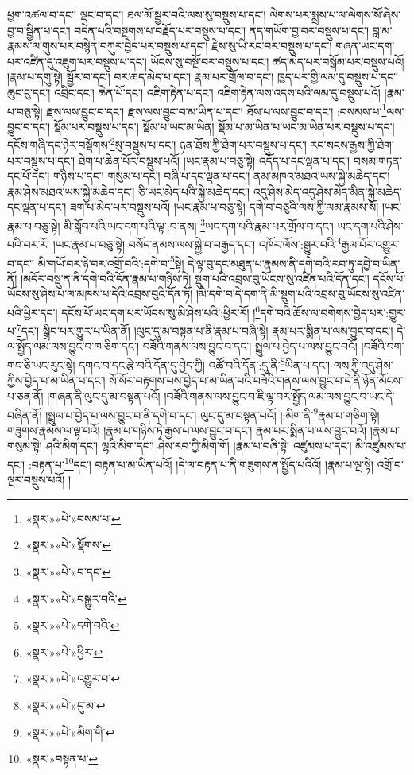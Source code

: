 ཕྱག་འཚལ་བ་དང་། ལྡང་བ་དང་། ཐལ་མོ་སྦྱར་བའི་ལས་སུ་བསྡུས་པ་དང་། ལེགས་པར་སྨྲས་པ་ལ་ལེགས་སོ་ཞེས་བྱ་བ་སྦྱིན་པ་དང་། བདེན་པའི་བསྔགས་པ་བརྗོད་པར་བསྡུས་པ་དང་། ནད་གཡོག་བྱ་བར་བསྡུས་པ་དང་། བླ་མ་རྣམས་ལ་གུས་པར་བསྙེན་བཀུར་བྱེད་པར་བསྡུས་པ་དང་། རྗེས་སུ་ཡི་རང་བར་བསྡུས་པ་དང་། གཞན་ཡང་དག་པར་འཛིན་དུ་འཇུག་པར་བསྡུས་པ་དང་། ཡོངས་སུ་བསྔོ་བར་བསྡུས་པ་དང་། ཚད་མེད་པར་བསྒོམ་པར་བསྡུས་པའོ། །རྣམ་པ་དགུ་སྟེ། སྦྱོར་བ་དང་། བར་ཆད་མེད་པ་དང་། རྣམ་པར་གྲོལ་བ་དང་། ཁྱད་པར་གྱི་ལམ་དུ་བསྡུས་པ་དང་། ཆུང་ངུ་དང་། འབྲིང་དང་། ཆེན་པོ་དང་། འཇིག་རྟེན་པ་དང་། འཇིག་རྟེན་ལས་འདས་པའི་ལམ་དུ་བསྡུས་པའོ། །རྣམ་པ་བཅུ་སྟེ། རྫས་ལས་བྱུང་བ་དང་། རྫས་ལས་བྱུང་བ་མ་ཡིན་པ་དང་། ཐོས་པ་ལས་བྱུང་བ་དང་། :བསམས་པ་\footnote{«སྣར་»«པེ་»བསམ་པ་}ལས་བྱུང་བ་དང་། སྡོམ་པར་བསྡུས་པ་དང་། སྡོམ་པ་ཡང་མ་ཡིན། སྡོམ་པ་མ་ཡིན་པ་ཡང་མ་ཡིན་པར་བསྡུས་པ་དང་། དངོས་གཞི་དང་ཉེར་བསྡོགས་\footnote{«སྣར་»«པེ་»སྡོགས་}སུ་བསྡུས་པ་དང་། ཉན་ཐོས་ཀྱི་ཐེག་པར་བསྡུས་པ་དང་། རང་སངས་རྒྱས་ཀྱི་ཐེག་པར་བསྡུས་པ་དང་། ཐེག་པ་ཆེན་པོར་བསྡུས་པའོ། །ཡང་རྣམ་པ་བཅུ་སྟེ། འདོད་པ་དང་ལྡན་པ་དང་། བསམ་གཏན་དང་པོ་དང་། གཉིས་པ་དང་། གསུམ་པ་དང་། བཞི་པ་དང་ལྡན་པ་དང་། ནམ་མཁའ་མཐའ་ཡས་སྐྱེ་མཆེད་དང་། རྣམ་ཤེས་མཐའ་ཡས་སྐྱེ་མཆེད་དང་། ཅི་ཡང་མེད་པའི་སྐྱེ་མཆེད་དང་། འདུ་ཤེས་མེད་འདུ་ཤེས་མེད་མིན་སྐྱེ་མཆེད་དང་ལྡན་པ་དང་། ཟག་པ་མེད་པར་བསྡུས་པའོ། །ཡང་རྣམ་པ་བཅུ་སྟེ། དགེ་བ་བཅུའི་ལས་ཀྱི་ལམ་རྣམས་སོ། །ཡང་རྣམ་པ་བཅུ་སྟེ། མི་སློབ་པའི་ཡང་དག་པའི་ལྟ་:བ་ནས། \footnote{«སྣར་»«པེ་»བ་དང་}ཡང་དག་པའི་རྣམ་པར་གྲོལ་བ་དང་། ཡང་དག་པའི་ཤེས་པའི་བར་རོ། །ཡང་རྣམ་པ་བཅུ་སྟེ། བསོད་ནམས་ལས་སྐྱེ་བ་བརྒྱད་དང་། འཁོར་ལོས་:སྒྱུར་བའི་\footnote{«སྣར་»«པེ་»བསྒྱུར་བའི་}རྒྱལ་པོར་འགྱུར་བ་དང་། མི་གཡོ་བར་ཉེ་བར་འགྲོ་བའི་:དགེ་བ་\footnote{«སྣར་»«པེ་»དགེ་བའི་}སྟེ། དེ་ལྟ་བུ་དང་མཐུན་པ་རྣམས་ནི་དགེ་བའི་རབ་ཏུ་དབྱེ་བ་ཡིན་ནོ། །མདོར་བསྡུ་ན་ནི་དགེ་བའི་དོན་རྣམ་པ་གཉིས་ཏེ། སྡུག་པའི་འབྲས་བུ་ཡོངས་སུ་འཛིན་པའི་དོན་དང་། དངོས་པོ་ཡོངས་སུ་ཤེས་པ་ལ་མཁས་པ་དེའི་འབྲས་བུའི་དོན་ཏོ། །མི་དགེ་བ་དེ་དག་ནི་མི་སྡུག་པའི་འབྲས་བུ་ཡོངས་སུ་འཛིན་པའི་ཕྱིར་དང་། དངོས་པོ་ཡང་དག་པར་ཡོངས་སུ་མི་ཤེས་པའི་:ཕྱིར་རོ། །\footnote{«སྣར་»«པེ་»ཕྱིར་}དགེ་བའི་ཆོས་ལ་བགེགས་བྱེད་པར་:གྱུར་པ་\footnote{«སྣར་»«པེ་»འགྱུར་བ་}དང་། སྒྲིབ་པར་གྱུར་པ་ཡིན་ནོ། །ལུང་དུ་མ་བསྟན་པ་ནི་རྣམ་པ་བཞི་སྟེ། རྣམ་པར་སྨིན་པ་ལས་བྱུང་བ་དང་། དེ་ལ་སྤྱོད་ལམ་ལས་བྱུང་བ་ཁ་ཅིག་དང་། བཟོའི་གནས་ལས་བྱུང་བ་དང་། སྤྲུལ་པ་བྱེད་པ་ལས་བྱུང་བའོ། །བཟོའི་བག་གང་ཅི་ཡང་རུང་སྟེ། དགའ་བ་དང་རྩེ་བའི་དོན་དུ་བྱེད་ཀྱི། འཚོ་བའི་དོན་:དུ་ནི་\footnote{«སྣར་»«པེ་»དུ་མ་}ཡིན་པ་དང་། ལས་ཀྱི་འདུ་ཤེས་ཀྱིས་བྱེད་པ་མ་ཡིན་པ་དང་། སོ་སོར་བརྟགས་པས་བྱེད་པ་མ་ཡིན་པའི་བཟོའི་གནས་ལས་བྱུང་བ་དེ་ནི་ཉོན་མོངས་པ་ཅན་ནོ། །གཞན་ནི་ལུང་དུ་མ་བསྟན་པའོ། །བཟོའི་གནས་ལས་བྱུང་བ་ཇི་ལྟ་བར་སྤྱོད་ལམ་ལས་བྱུང་བ་ཡང་དེ་བཞིན་ནོ། །སྤྲུལ་པ་བྱེད་པ་ལས་བྱུང་བ་ནི་དགེ་བ་དང་། ལུང་དུ་མ་བསྟན་པའོ། །:མིག་ནི་\footnote{«སྣར་»«པེ་»མིག་གི་}རྣམ་པ་གཅིག་སྟེ། གཟུགས་རྣམས་ལ་ལྟ་བའོ། །རྣམ་པ་གཉིས་ཏེ་རྒྱས་པ་ལས་བྱུང་བ་དང་། རྣམ་པར་སྨིན་པ་ལས་བྱུང་བའོ། །རྣམ་པ་གསུམ་སྟེ། ཤའི་མིག་དང་། ལྷའི་མིག་དང་། ཤེས་རབ་ཀྱི་མིག་གོ། །རྣམ་པ་བཞི་སྟེ། འཛུམས་པ་དང་། མི་འཛུམས་པ་དང་། :བརྟན་པ་\footnote{«སྣར་»བསྟན་པ་}དང་། བརྟན་པ་མ་ཡིན་པའོ། །དེ་ལ་བརྟན་པ་ནི་གཟུགས་ན་སྤྱོད་པའིའོ། །རྣམ་པ་ལྔ་སྟེ། འགྲོ་བ་ལྔར་བསྡུས་པའོ། །
